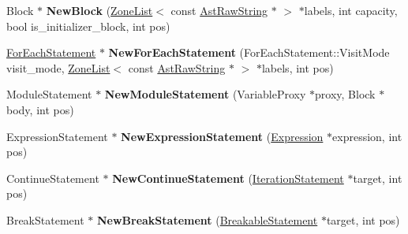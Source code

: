 \begin{DoxyCompactItemize}
\item 
\hypertarget{classv8_1_1internal_1_1_b_a_s_e___e_m_b_e_d_d_e_d_ada74dbfe2d3c5bd1fd94e27edf7b8cfc}{}Block $\ast$ {\bfseries New\+Block} (\hyperlink{classv8_1_1internal_1_1_zone_list}{Zone\+List}$<$ const \hyperlink{classv8_1_1internal_1_1_ast_raw_string}{Ast\+Raw\+String} $\ast$ $>$ $\ast$labels, int capacity, bool is\+\_\+initializer\+\_\+block, int pos)\label{classv8_1_1internal_1_1_b_a_s_e___e_m_b_e_d_d_e_d_ada74dbfe2d3c5bd1fd94e27edf7b8cfc}

\item 
\hypertarget{classv8_1_1internal_1_1_b_a_s_e___e_m_b_e_d_d_e_d_ae61ef56ca174bf5da89bb76298bcc253}{}\hyperlink{classv8_1_1internal_1_1_for_each_statement}{For\+Each\+Statement} $\ast$ {\bfseries New\+For\+Each\+Statement} (For\+Each\+Statement\+::\+Visit\+Mode visit\+\_\+mode, \hyperlink{classv8_1_1internal_1_1_zone_list}{Zone\+List}$<$ const \hyperlink{classv8_1_1internal_1_1_ast_raw_string}{Ast\+Raw\+String} $\ast$ $>$ $\ast$labels, int pos)\label{classv8_1_1internal_1_1_b_a_s_e___e_m_b_e_d_d_e_d_ae61ef56ca174bf5da89bb76298bcc253}

\item 
\hypertarget{classv8_1_1internal_1_1_b_a_s_e___e_m_b_e_d_d_e_d_a1b1ccf56e53cd2f6368150c4a7778ac3}{}Module\+Statement $\ast$ {\bfseries New\+Module\+Statement} (Variable\+Proxy $\ast$proxy, Block $\ast$body, int pos)\label{classv8_1_1internal_1_1_b_a_s_e___e_m_b_e_d_d_e_d_a1b1ccf56e53cd2f6368150c4a7778ac3}

\item 
\hypertarget{classv8_1_1internal_1_1_b_a_s_e___e_m_b_e_d_d_e_d_ad6d74dd75f8b86e4770c7be6798eb06c}{}Expression\+Statement $\ast$ {\bfseries New\+Expression\+Statement} (\hyperlink{classv8_1_1internal_1_1_expression}{Expression} $\ast$expression, int pos)\label{classv8_1_1internal_1_1_b_a_s_e___e_m_b_e_d_d_e_d_ad6d74dd75f8b86e4770c7be6798eb06c}

\item 
\hypertarget{classv8_1_1internal_1_1_b_a_s_e___e_m_b_e_d_d_e_d_a40fdf859aaf731bca4611f910d95bebf}{}Continue\+Statement $\ast$ {\bfseries New\+Continue\+Statement} (\hyperlink{classv8_1_1internal_1_1_iteration_statement}{Iteration\+Statement} $\ast$target, int pos)\label{classv8_1_1internal_1_1_b_a_s_e___e_m_b_e_d_d_e_d_a40fdf859aaf731bca4611f910d95bebf}

\item 
\hypertarget{classv8_1_1internal_1_1_b_a_s_e___e_m_b_e_d_d_e_d_ad9204890c9ff18e9b6752ca50c76d3cc}{}Break\+Statement $\ast$ {\bfseries New\+Break\+Statement} (\hyperlink{classv8_1_1internal_1_1_breakable_statement}{Breakable\+Statement} $\ast$target, int pos)\label{classv8_1_1internal_1_1_b_a_s_e___e_m_b_e_d_d_e_d_ad9204890c9ff18e9b6752ca50c76d3cc}


\end{DoxyCompactItemize}
